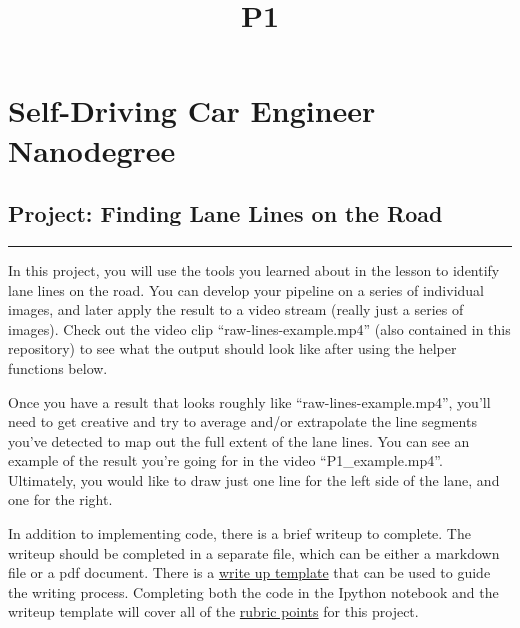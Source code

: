 \documentclass[11pt]{article}
\title{P1}
\begin{document}
    
    
    \maketitle
    
    

    
    \hypertarget{self-driving-car-engineer-nanodegree}{%
\section{Self-Driving Car Engineer
Nanodegree}\label{self-driving-car-engineer-nanodegree}}

\hypertarget{project-finding-lane-lines-on-the-road}{%
\subsection{\texorpdfstring{Project: \textbf{Finding Lane Lines on the
Road}}{Project: Finding Lane Lines on the Road}}\label{project-finding-lane-lines-on-the-road}}

\begin{center}\rule{0.5\linewidth}{\linethickness}\end{center}

In this project, you will use the tools you learned about in the lesson
to identify lane lines on the road. You can develop your pipeline on a
series of individual images, and later apply the result to a video
stream (really just a series of images). Check out the video clip
``raw-lines-example.mp4'' (also contained in this repository) to see
what the output should look like after using the helper functions below.

Once you have a result that looks roughly like
``raw-lines-example.mp4'', you'll need to get creative and try to
average and/or extrapolate the line segments you've detected to map out
the full extent of the lane lines. You can see an example of the result
you're going for in the video ``P1\_example.mp4''. Ultimately, you would
like to draw just one line for the left side of the lane, and one for
the right.

In addition to implementing code, there is a brief writeup to complete.
The writeup should be completed in a separate file, which can be either
a markdown file or a pdf document. There is a
\href{https://github.com/udacity/CarND-LaneLines-P1/blob/master/writeup_template.md}{write
up template} that can be used to guide the writing process. Completing
both the code in the Ipython notebook and the writeup template will
cover all of the
\href{https://review.udacity.com/\#!/rubrics/322/view}{rubric points}
for this project.
\end{document}
